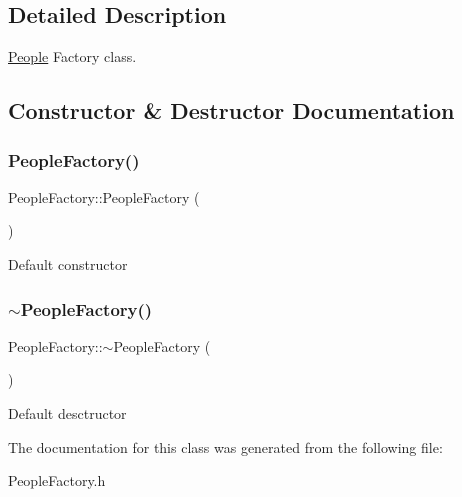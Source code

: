 \subsection{Detailed Description}
\hyperlink{classPeople}{People} Factory class. 

\subsection{Constructor \& Destructor Documentation}
\mbox{\label{classPeopleFactory_a937ce020364a355d6689c365ba70f0d6}} 
\subsubsection{\texorpdfstring{People\+Factory()}{PeopleFactory()}}
{\footnotesize\ttfamily People\+Factory\+::\+People\+Factory (\begin{DoxyParamCaption}{ }\end{DoxyParamCaption})\hspace{0.3cm}{\ttfamily [inline]}}

Default constructor \mbox{\label{classPeopleFactory_a18d1aec526ba93ca84cde1c25cfb8944}} 
\subsubsection{\texorpdfstring{$\sim$\+People\+Factory()}{~PeopleFactory()}}
{\footnotesize\ttfamily People\+Factory\+::$\sim$\+People\+Factory (\begin{DoxyParamCaption}{ }\end{DoxyParamCaption})\hspace{0.3cm}{\ttfamily [inline]}}

Default desctructor 

The documentation for this class was generated from the following file\+:\begin{DoxyCompactItemize}
\item 
People\+Factory.\+h\end{DoxyCompactItemize}

